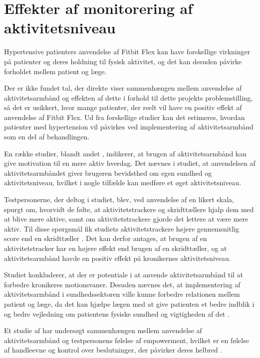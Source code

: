 \section{Effekter af monitorering af aktivitetsniveau}
Hypertensive patienters anvendelse af Fitbit Flex kan have forskellige virkninger på patienter og deres holdning til fysisk aktivitet, og det kan desuden påvirke forholdet mellem patient og læge.

Der er ikke fundet tal, der direkte viser sammenhængen mellem anvendelse af aktivitetsarmbånd og effekten af dette i forhold til dette projekts problemstilling, så det er usikkert, hvor mange patienter, der reelt vil have en positiv effekt af anvendelse af Fitbit Flex. Ud fra forskellige studier kan det estimeres, hvordan patienter med hypertension vil påvirkes ved implementering af aktivitetsarmbånd som en del af behandlingen.

En række studier, blandt andet  \citeauthor{mercer2016}, indikerer, at brugen af aktivitetsarmbånd kan give motivation til en mere aktiv hverdag. Det nævnes i studiet, at anvendelsen af aktivitetsarmbåndet giver brugeren bevidsthed om egen sundhed og aktivitetsniveau, hvilket i nogle tilfælde kan medføre et øget aktivitetsniveau. 

Testpersonerne, der deltog i studiet, blev, ved anvendelse af en likert skala, spurgt om, hvorvidt de følte, at aktivitetstrackere og skridttællere hjalp dem med at blive mere aktive, samt om aktivitetstrackere gjorde det lettere at være mere aktiv. Til disse spørgsmål fik studiets aktivitetstrackere højere gennemsnitlig score end en skridttæller \citep{mercer2016}. Det kan derfor antages, at brugen af en aktivitetstracker har en højere effekt end brugen af en skridttæller, og at aktivitetsarmbånd havde en positiv effekt på kronikernes aktivitetsniveau.

Studiet konkluderer, at der er potentiale i at anvende aktivitetsarmbånd til at forbedre kronikeres motionsvaner. Desuden nævnes det, at implementering af aktivitetsarmbånd i sundhedssektoren ville kunne forbedre relationen mellem patient og læge, da det kan hjælpe lægen med at give patienten et bedre indblik i og bedre vejledning om patientens fysiske sundhed og vigtigheden af det \citep{mercer2016}. 

Et studie af \citeauthor{nelson2016} har undersøgt sammenhængen mellem anvendelse af aktivitetsarmbånd og testpersonens følelse af empowerment, hvilket er en følelse af handleevne og kontrol over beslutninger, der påvirker deres helbred \citep{toennesen2005}.

